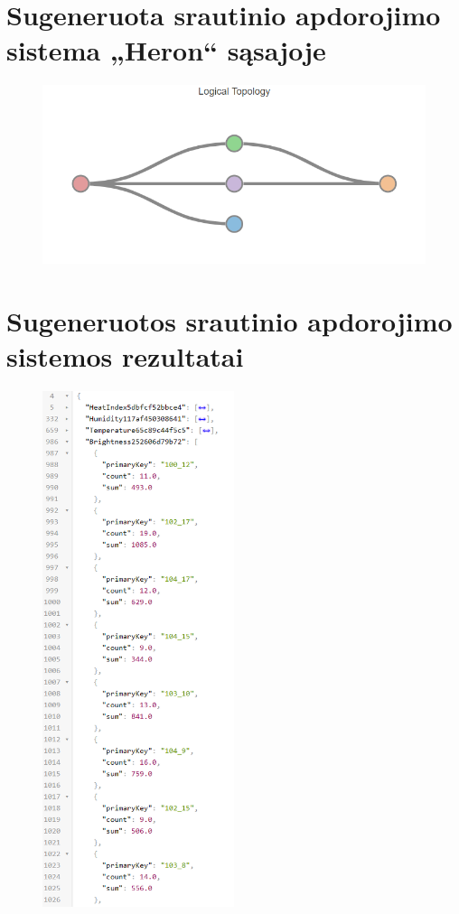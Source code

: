 \documentclass{VUMIFPSbakalaurinis}
\begin{document}
\section{Sugeneruota srautinio apdorojimo sistema „Heron“ sąsajoje}\label{add:generated-system1}
\begin{figure}[H]
    \centering
    \includegraphics[width=1\textwidth]{img/generated-topology-1.png}
    \label{img:generated-data}
\end{figure}

\section{Sugeneruotos srautinio apdorojimo sistemos rezultatai}\label{add:generated-data1}
\begin{figure}[H]
    \centering
    \includegraphics[width=0.5\textwidth]{img/topology-data-1.png}
    \label{img:generated-data}
\end{figure}
\end{document}
